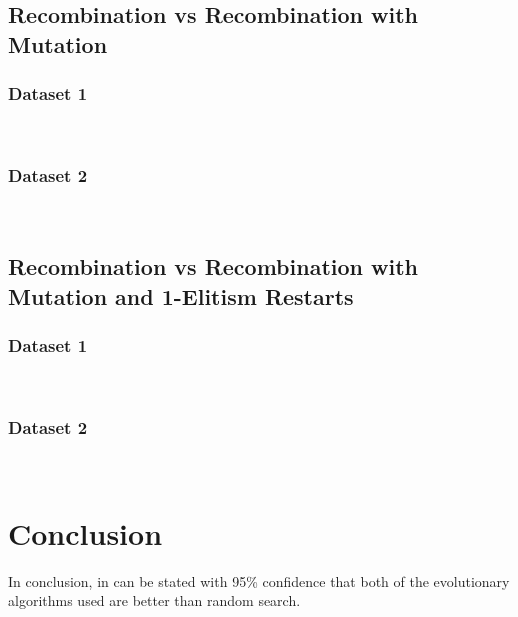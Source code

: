 \documentclass{article}
\begin{document}
\subsection{Recombination vs Recombination with Mutation}
\subsubsection{Dataset 1}
\begin{paragraph}
\\
\end{paragraph}
\subsubsection{Dataset 2}
\begin{paragraph}
\\
\end{paragraph}
\subsection{Recombination vs Recombination with Mutation and 1-Elitism Restarts}
\subsubsection{Dataset 1}
\begin{paragraph}
\\
\end{paragraph}
\subsubsection{Dataset 2}
\begin{paragraph}
\\
\end{paragraph}


\section{Conclusion}

\begin{flushleft}
In conclusion, in can be stated with 95\% confidence that both of the
evolutionary algorithms used are better than random search.
\end{flushleft}
\end{document}
